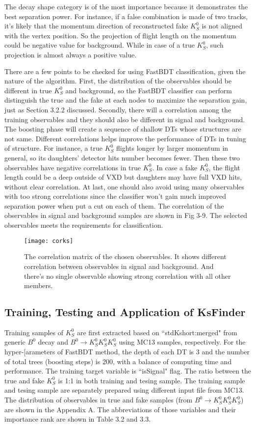 The decay shape category is of the most importance because it demonstrates the best separation power. For instance, if a false combination is made of two tracks, it's likely that the momentum direction of reconstructed fake $K_S^0$ is not aligned with the vertex position. So the projection of flight length on the momentum could be negative value for background. While in case of a true $K_S^0$, such projection is almost always a positive value.
 
There are a few points to be checked for using FastBDT classification, given the nature of the algorithm.
 First, the distribution of the observables should be different in true $K_S^0$ and background, so the FastBDT classifier can perform distinguish the true and the fake at each nodes to maximize the separation gain, just as Section 3.2.2 discussed. Secondly, there will a correlation among the training observables and they should also be different in signal and background. The boosting phase will create a sequence of shallow DTs whose structures are not same. Different correlations helps improve the performance of DTs in tuning of structure. For instance, a true $K_S^0$ flights longer by larger momentum in general, so its daughters' detector hits number becomes fewer. Then these two observables have negative correlations in true $K_S^0$. In case a fake $K_S^0$, the flight length could be a deep outside of VXD  but daughters may have full VXD hits, without clear correlation. At last, one should also avoid using many observables with too strong correlations since the classifier won't gain much improved separation power when put a cut on each of them. The correlation of the observables in signal and background samples are shown in Fig 3-9. The selected observables meets the requirements for classification. 
 
 \begin{figure}
 	\centering 
 	\texttt{[image: corks]}
 	\caption{The correlation matrix of the chosen observables. It shows different correlation between observables in signal and background. And there's no single observable showing strong correlation with all other members. }
 \end{figure}
 

 \subsection{Training, Testing and Application of KsFinder}
 Training samples of $K_S^0$ are first extracted based on ``stdKshort:merged" from generic $B^0$ decay and $B^0 \to K_S^0  K_S^0  K_S^0$ using MC13 samples, respectively. For the hyper-[arameters of FastBDT method, the depth of each DT is 3 and the number of total trees (boosting steps) is 200, with a balance of computing time and performance. The training target variable is ``isSignal" flag. The ratio between the true and fake $K_S^0$ is 1:1 in both training and tesing sample. The training sample and tesing sample are separately prepared using different input file from MC13. The distribution of observables in true and fake samples (from $B^0 \to K_S^0  K_S^0  K_S^0$) are shown in the Appendix A. The abbreviations of those variables and their importance rank are shown in Table 3.2 and 3.3. 
 
